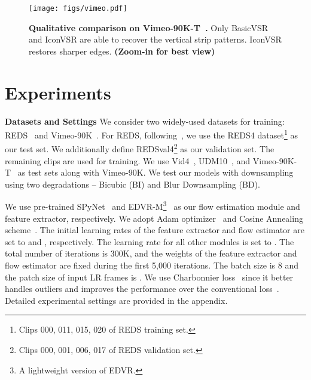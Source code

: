 \documentclass[final]{cvpr}
\begin{document}
\begin{figure*}[!t]
	\begin{center}
		\texttt{[image: figs/vimeo.pdf]}
		\caption{\textbf{Qualitative comparison on Vimeo-90K-T~\cite{xue2019video}.} Only \mbox{BasicVSR} and \mbox{IconVSR} are able to recover the vertical strip patterns. \mbox{IconVSR} restores sharper edges. \textbf{(Zoom-in for best view)}}
		\vspace{-0.5cm}
		\label{fig:vimeo}
	\end{center}
\end{figure*}

\section{Experiments}
\label{sec:exp}
\noindent\textbf{Datasets and Settings}
We consider two widely-used datasets for training: REDS~\cite{nah2019ntire} and Vimeo-90K~\cite{xue2019video}.
For REDS, following~\cite{wang2019edvr}, we use the REDS4 dataset\footnote{Clips 000, 011, 015, 020 of REDS training set.} as our test set. We additionally define REDSval4\footnote{Clips 000, 001, 006, 017 of REDS validation set.} as our validation set. The remaining clips are used for training.
We use Vid4~\cite{liu2014bayesian}, UDM10~\cite{yi2019progressive}, and Vimeo-90K-T~\cite{xue2019video} as test sets along with Vimeo-90K.
We test our models with  downsampling using two degradations -- Bicubic (BI) and Blur Downsampling (BD).

We use pre-trained SPyNet~\cite{ranjan2017optical} and EDVR-M\footnote{A lightweight version of EDVR.}~\cite{wang2019edvr} as our flow estimation module and feature extractor, respectively. We adopt Adam optimizer~\cite{kingma2014adam} and Cosine Annealing scheme~\cite{loshchilov2016sgdr}. The initial learning rates of the feature extractor and flow estimator are set to  and , respectively. The learning rate for all other modules is set to . The total number of iterations is 300K, and the weights of the feature extractor and flow estimator are fixed during the first 5,000 iterations. The batch size is 8 and the patch size of input LR frames is . We use Charbonnier loss~\cite{charbonnier1994two} since it better handles outliers and improves the performance over the conventional  loss~\cite{lai2017deep}. Detailed experimental settings are provided in the appendix.
\end{document}
